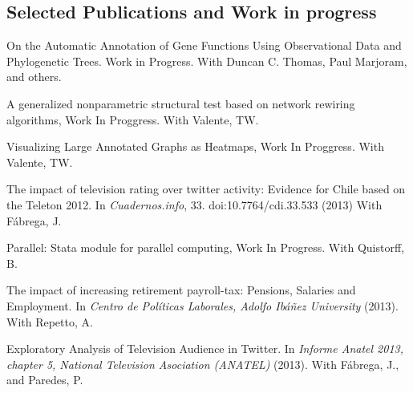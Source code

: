 \documentclass[letterpaper, 11pt]{article}
\renewenvironment{itemize}{
  \begin{list}{}{
    \setlength{\leftmargin}{0.45cm}
  }
}{
  \end{list}
}
\begin{document}
\subsection*{Selected Publications and Work in progress}
\begin{itemize}

\item On the Automatic Annotation of Gene Functions Using Observational Data and Phylogenetic Trees. Work in Progress. With Duncan C. Thomas, Paul Marjoram, and others.
\item A generalized nonparametric structural test based on network rewiring algorithms, Work In Proggress. With Valente, TW.
\item Visualizing Large Annotated Graphs as Heatmaps, Work In Proggress. With Valente, TW.
\item The impact of television rating over twitter activity: Evidence for Chile based on the Teleton 2012. In {\it Cuadernos.info}, 33. doi:10.7764/cdi.33.533 (2013) With F\'abrega, J.
\item Parallel: Stata module for parallel computing, Work In Progress. With Quistorff, B.
\item The impact of increasing retirement payroll-tax: Pensions, Salaries and Employment. In {\it Centro de Pol\'iticas Laborales, Adolfo Ib\'a\~nez University} (2013). With Repetto, A.
\item Exploratory Analysis of Television Audience in Twitter. In {\it Informe Anatel 2013, chapter 5, National Television Asociation (ANATEL)} (2013). With F\'abrega, J., and Paredes, P.
\end{itemize}
\end{document}
